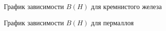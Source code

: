 \documentclass[a4paper, 12pt]{article}%
\begin{document}
	\begin{figure}[h]
		\caption{График зависимости $B(H)$ для кремнистого железа}
	\end{figure}
	
	\begin{figure}[h]
		\caption{График зависимости $B(H)$ для пермаллоя}
	\end{figure}



	
\end{document}
